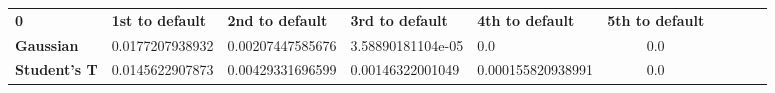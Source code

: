 \begin{tabular}{|l|l|l|l|l|c|c|c|c|c|}
\hline
\textbf{0} & \textbf{1st to default} & \textbf{2nd to default} & \textbf{3rd to default} & \textbf{4th to default} & \textbf{5th to default}\\\hhline{|=|=|=|=|=|=|}
\textbf{Gaussian} & 0.0177207938932 & 0.00207447585676 & 3.58890181104e-05 & 0.0 & 0.0\\
\textbf{Student's T} & 0.0145622907873 & 0.00429331696599 & 0.00146322001049 & 0.000155820938991 & 0.0\\
\hline
\end{tabular}
